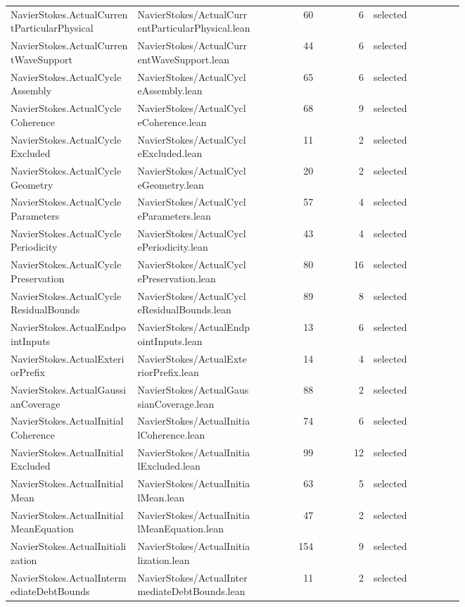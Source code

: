 \documentclass[10pt]{article}
\begin{document}
\begin{longtable}{p{0.28\linewidth}p{0.27\linewidth}r r p{0.20\linewidth}}
NavierStokes.ActualCurrentParticularPhysical & NavierStokes/ActualCurrentParticularPhysical.lean & 60 & 6 & selected\\
NavierStokes.ActualCurrentWaveSupport & NavierStokes/ActualCurrentWaveSupport.lean & 44 & 6 & selected\\
NavierStokes.ActualCycleAssembly & NavierStokes/ActualCycleAssembly.lean & 65 & 6 & selected\\
NavierStokes.ActualCycleCoherence & NavierStokes/ActualCycleCoherence.lean & 68 & 9 & selected\\
NavierStokes.ActualCycleExcluded & NavierStokes/ActualCycleExcluded.lean & 11 & 2 & selected\\
NavierStokes.ActualCycleGeometry & NavierStokes/ActualCycleGeometry.lean & 20 & 2 & selected\\
NavierStokes.ActualCycleParameters & NavierStokes/ActualCycleParameters.lean & 57 & 4 & selected\\
NavierStokes.ActualCyclePeriodicity & NavierStokes/ActualCyclePeriodicity.lean & 43 & 4 & selected\\
NavierStokes.ActualCyclePreservation & NavierStokes/ActualCyclePreservation.lean & 80 & 16 & selected\\
NavierStokes.ActualCycleResidualBounds & NavierStokes/ActualCycleResidualBounds.lean & 89 & 8 & selected\\
NavierStokes.ActualEndpointInputs & NavierStokes/ActualEndpointInputs.lean & 13 & 6 & selected\\
NavierStokes.ActualExteriorPrefix & NavierStokes/ActualExteriorPrefix.lean & 14 & 4 & selected\\
NavierStokes.ActualGaussianCoverage & NavierStokes/ActualGaussianCoverage.lean & 88 & 2 & selected\\
NavierStokes.ActualInitialCoherence & NavierStokes/ActualInitialCoherence.lean & 74 & 6 & selected\\
NavierStokes.ActualInitialExcluded & NavierStokes/ActualInitialExcluded.lean & 99 & 12 & selected\\
NavierStokes.ActualInitialMean & NavierStokes/ActualInitialMean.lean & 63 & 5 & selected\\
NavierStokes.ActualInitialMeanEquation & NavierStokes/ActualInitialMeanEquation.lean & 47 & 2 & selected\\
NavierStokes.ActualInitialization & NavierStokes/ActualInitialization.lean & 154 & 9 & selected\\
NavierStokes.ActualIntermediateDebtBounds & NavierStokes/ActualIntermediateDebtBounds.lean & 11 & 2 & selected\\

\end{longtable}
\end{document}

